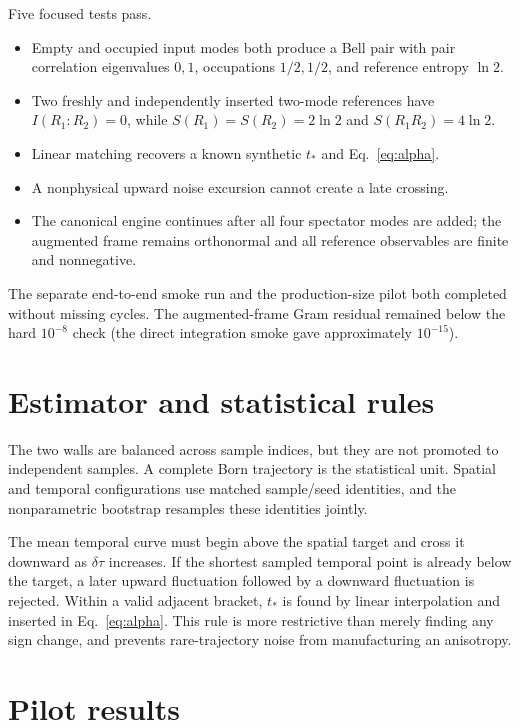 \documentclass[10pt]{article}
\begin{document}
Five focused tests pass.
\begin{itemize}
\item Empty and occupied input modes both produce a Bell pair with pair
      correlation eigenvalues $0,1$, occupations $1/2,1/2$, and reference
      entropy $\ln2$.
\item Two freshly and independently inserted two-mode references have
      $I(R_1:R_2)=0$, while $S(R_1)=S(R_2)=2\ln2$ and
      $S(R_1R_2)=4\ln2$.
\item Linear matching recovers a known synthetic $t_*$ and Eq.~\eqref{eq:alpha}.
\item A nonphysical upward noise excursion cannot create a late crossing.
\item The canonical engine continues after all four spectator modes are added;
      the augmented frame remains orthonormal and all reference observables are
      finite and nonnegative.
\end{itemize}
The separate end-to-end smoke run and the production-size pilot both completed
without missing cycles.  The augmented-frame Gram residual remained below the
hard $10^{-8}$ check (the direct integration smoke gave approximately
$10^{-15}$).

\section{Estimator and statistical rules}

The two walls are balanced across sample indices, but they are not promoted to
independent samples.  A complete Born trajectory is the statistical unit.
Spatial and temporal configurations use matched sample/seed identities, and
the nonparametric bootstrap resamples these identities jointly.

The mean temporal curve must begin above the spatial target and cross it
downward as $\delta\tau$ increases.  If the shortest sampled temporal point is
already below the target, a later upward fluctuation followed by a downward
fluctuation is rejected.  Within a valid adjacent bracket, $t_*$ is found by
linear interpolation and inserted in Eq.~\eqref{eq:alpha}.  This rule is more
restrictive than merely finding any sign change, and prevents rare-trajectory
noise from manufacturing an anisotropy.

\section{Pilot results}
\end{document}
